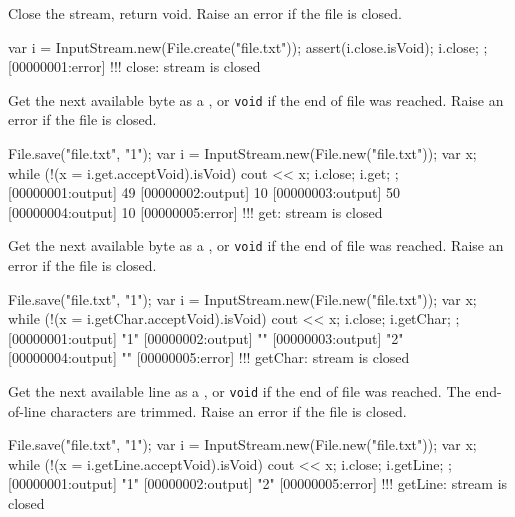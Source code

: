 \begin{urbiscriptapi}
\item[close] Close the stream, return void.  Raise an error if the file is
  closed.
\begin{urbiscript}
{
  var i = InputStream.new(File.create("file.txt"));
  assert(i.close.isVoid);
  i.close;
};
[00000001:error] !!! close: stream is closed
\end{urbiscript}

\item[get]%
  Get the next available byte as a , or \lstinline|void| if
  the end of file was reached.  Raise an error if the file is closed.
\begin{urbiscript}
{
  File.save("file.txt", "1\n");
  var i = InputStream.new(File.new("file.txt"));
  var x;
  while (!(x = i.get.acceptVoid).isVoid)
    cout << x;
  i.close;
  i.get;
};
[00000001:output] 49
[00000002:output] 10
[00000003:output] 50
[00000004:output] 10
[00000005:error] !!! get: stream is closed
\end{urbiscript}

\item[getChar]%
  Get the next available byte as a , or \lstinline|void|
  if the end of file was reached.  Raise an error if the file is closed.
\begin{urbiscript}
{
  File.save("file.txt", "1\n");
  var i = InputStream.new(File.new("file.txt"));
  var x;
  while (!(x = i.getChar.acceptVoid).isVoid)
    cout << x;
  i.close;
  i.getChar;
};
[00000001:output] "1"
[00000002:output] "\n"
[00000003:output] "2"
[00000004:output] "\n"
[00000005:error] !!! getChar: stream is closed
\end{urbiscript}

\item[getLine]%
  Get the next available line as a , or \lstinline|void|
  if the end of file was reached.  The end-of-line characters are trimmed.
  Raise an error if the file is closed.
\begin{urbiscript}
{
  File.save("file.txt", "1\n");
  var i = InputStream.new(File.new("file.txt"));
  var x;
  while (!(x = i.getLine.acceptVoid).isVoid)
    cout << x;
  i.close;
  i.getLine;
};
[00000001:output] "1"
[00000002:output] "2"
[00000005:error] !!! getLine: stream is closed
\end{urbiscript}
\end{urbiscriptapi}


